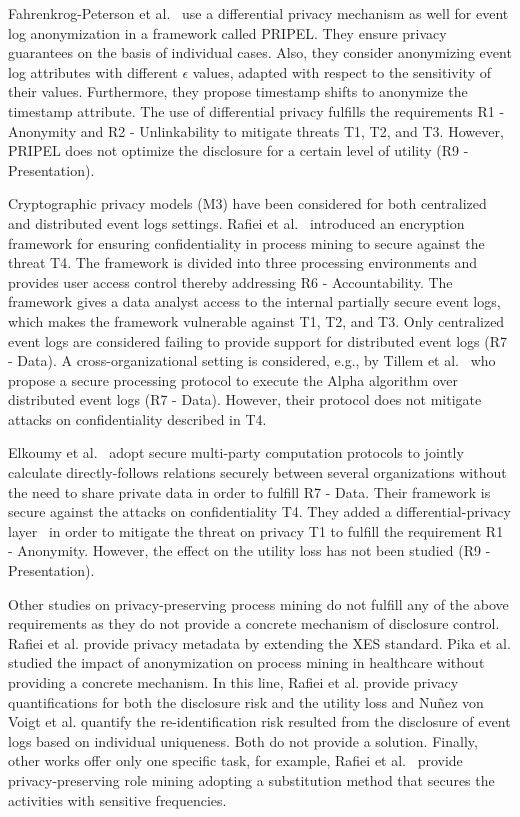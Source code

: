 \documentclass[manuscript]{acmart}
\begin{document}
Fahrenkrog-Peterson et al.~\cite{fahrenkrog2020pripel} use a differential privacy mechanism as well for event log anonymization in a framework called PRIPEL. They ensure privacy guarantees on the basis of individual cases. Also, they consider anonymizing event log attributes with different $\epsilon$ values, adapted with respect to the sensitivity of their values. Furthermore, they propose timestamp shifts to anonymize the timestamp attribute. The use of differential privacy fulfills the requirements R1 - Anonymity and R2 - Unlinkability to mitigate threats T1, T2, and T3. However, PRIPEL does not optimize the disclosure for a certain level of utility (R9 - Presentation).

Cryptographic privacy models (M3) have been considered for both centralized and distributed event logs settings. Rafiei et al.~\cite{rafieiWA19_short,rafiei2018ensuring} introduced an encryption framework for ensuring confidentiality in process mining to secure against the threat T4. The framework is divided into three processing environments and provides user access control thereby addressing R6 - Accountability. The framework gives a data analyst access to the internal partially secure event logs, which makes the framework vulnerable against T1, T2, and T3. Only centralized event logs are considered failing to provide support for distributed event logs (R7 - Data). A cross-organizational setting is considered, e.g., by Tillem et al.~\cite{tillem2017mining} who propose a secure processing protocol to execute the Alpha algorithm over distributed event logs (R7 - Data). However, their protocol does not mitigate attacks on confidentiality described in T4.

Elkoumy et al.~\cite{elkoumy2020secure,elkoumy2020shareprom} adopt secure multi-party computation protocols to jointly calculate directly-follows relations securely between several organizations without the need to share private data in order to fulfill R7 - Data. Their framework is secure against the attacks on confidentiality T4. They added a differential-privacy layer~\cite{elkoumy2020shareprom} in order to mitigate the threat on privacy T1 to fulfill the requirement R1 - Anonymity. However, the effect on the utility loss has not been studied (R9 - Presentation).

Other studies on privacy-preserving process mining do not fulfill any of the above requirements as they do not provide a concrete mechanism of disclosure control. Rafiei et al. \cite{rafieippdp_google,rafieippdpTool_short} provide privacy metadata by extending the XES standard. Pika et al. \cite{pika2020privacy} studied the impact of anonymization on process mining in healthcare without providing a concrete mechanism. In this line, Rafiei et al. \cite{rafiei2020towards} provide privacy quantifications for both the disclosure risk and the utility loss and Nu{\~n}ez von Voigt et al. \cite{nunez2020quantifying} quantify the re-identification risk resulted from the disclosure of event logs based on individual uniqueness. Both do not provide a solution. Finally, other works offer only one specific task, for example, Rafiei et al.~\cite{RafieiA19} provide privacy-preserving role mining adopting a substitution method that secures the activities with sensitive frequencies.
\end{document}
